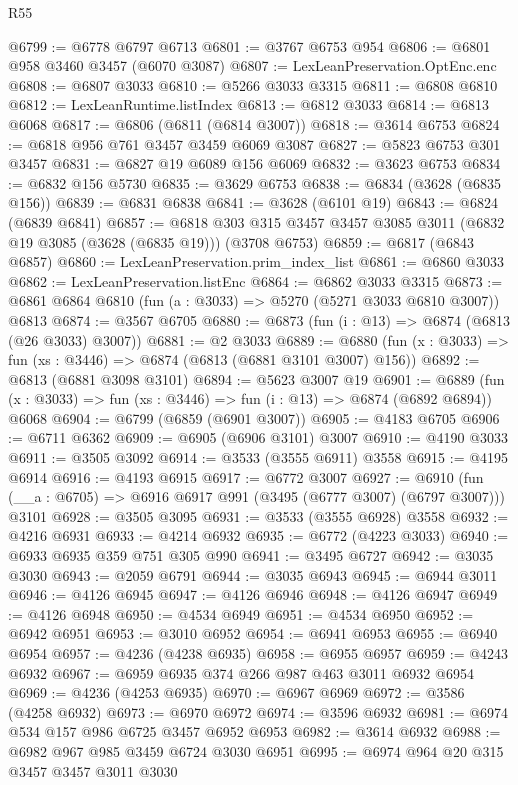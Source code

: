 \begin{lexlean}{R55}
\begin{coremodule}
@6799 := @6778 @6797 @6713
@6801 := @3767 @6753 @954
@6806 := @6801 @958 @3460 @3457 (@6070 @3087)
@6807 := LexLeanPreservation.OptEnc.enc
@6808 := @6807 @3033
@6810 := @5266 @3033 @3315
@6811 := @6808 @6810
@6812 := LexLeanRuntime.listIndex
@6813 := @6812 @3033
@6814 := @6813 @6068
@6817 := @6806 (@6811 (@6814 @3007))
@6818 := @3614 @6753
@6824 := @6818 @956 @761 @3457 @3459 @6069 @3087
@6827 := @5823 @6753 @301 @3457
@6831 := @6827 @19 @6089 @156 @6069
@6832 := @3623 @6753
@6834 := @6832 @156 @5730
@6835 := @3629 @6753
@6838 := @6834 (@3628 (@6835 @156))
@6839 := @6831 @6838
@6841 := @3628 (@6101 @19)
@6843 := @6824 (@6839 @6841)
@6857 := @6818 @303 @315 @3457 @3457 @3085 @3011 (@6832 @19 @3085 (@3628 (@6835 @19))) (@3708 @6753)
@6859 := @6817 (@6843 @6857)
@6860 := LexLeanPreservation.prim_index_list
@6861 := @6860 @3033
@6862 := LexLeanPreservation.listEnc
@6864 := @6862 @3033 @3315
@6873 := @6861 @6864 @6810 (fun (a : @3033) => @5270 (@5271 @3033 @6810 @3007)) @6813
@6874 := @3567 @6705
@6880 := @6873 (fun (i : @13) => @6874 (@6813 (@26 @3033) @3007))
@6881 := @2 @3033
@6889 := @6880 (fun (x : @3033) => fun (xs : @3446) => @6874 (@6813 (@6881 @3101 @3007) @156))
@6892 := @6813 (@6881 @3098 @3101)
@6894 := @5623 @3007 @19
@6901 := @6889 (fun (x : @3033) => fun (xs : @3446) => fun (i : @13) => @6874 (@6892 @6894)) @6068
@6904 := @6799 (@6859 (@6901 @3007))
@6905 := @4183 @6705
@6906 := @6711 @6362
@6909 := @6905 (@6906 @3101) @3007
@6910 := @4190 @3033
@6911 := @3505 @3092
@6914 := @3533 (@3555 @6911) @3558
@6915 := @4195 @6914
@6916 := @4193 @6915
@6917 := @6772 @3007
@6927 := @6910 (fun (__a : @6705) => @6916 @6917 @991 (@3495 (@6777 @3007) (@6797 @3007))) @3101
@6928 := @3505 @3095
@6931 := @3533 (@3555 @6928) @3558
@6932 := @4216 @6931
@6933 := @4214 @6932
@6935 := @6772 (@4223 @3033)
@6940 := @6933 @6935 @359 @751 @305 @990
@6941 := @3495 @6727
@6942 := @3035 @3030
@6943 := @2059 @6791
@6944 := @3035 @6943
@6945 := @6944 @3011
@6946 := @4126 @6945
@6947 := @4126 @6946
@6948 := @4126 @6947
@6949 := @4126 @6948
@6950 := @4534 @6949
@6951 := @4534 @6950
@6952 := @6942 @6951
@6953 := @3010 @6952
@6954 := @6941 @6953
@6955 := @6940 @6954
@6957 := @4236 (@4238 @6935)
@6958 := @6955 @6957
@6959 := @4243 @6932
@6967 := @6959 @6935 @374 @266 @987 @463 @3011 @6932 @6954
@6969 := @4236 (@4253 @6935)
@6970 := @6967 @6969
@6972 := @3586 (@4258 @6932)
@6973 := @6970 @6972
@6974 := @3596 @6932
@6981 := @6974 @534 @157 @986 @6725 @3457 @6952 @6953
@6982 := @3614 @6932
@6988 := @6982 @967 @985 @3459 @6724 @3030 @6951
@6995 := @6974 @964 @20 @315 @3457 @3457 @3011 @3030

\end{coremodule}
\end{lexlean}
